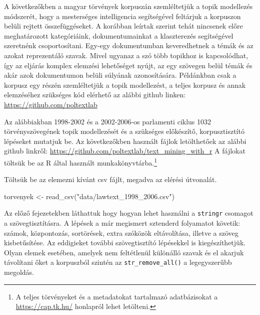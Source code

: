 \documentclass[
]{book}
\newenvironment{Shaded}{\begin{snugshade}}{\end{snugshade}}
\newcommand{\FunctionTok}[1]{\textcolor[rgb]{0.00,0.00,0.00}{#1}}
\newcommand{\NormalTok}[1]{#1}
\newcommand{\OtherTok}[1]{\textcolor[rgb]{0.56,0.35,0.01}{#1}}
\newcommand{\StringTok}[1]{\textcolor[rgb]{0.31,0.60,0.02}{#1}}
\begin{document}
A következőkben a magyar törvények korpuszán szemléltetjük a topik
modellezés módszerét, hogy a mesterséges intelligencia segítségével
feltárjuk a korpuszon belüli rejtett összefüggéseket. A korábban leírtak
szerint tehát nincsenek előre meghatározott kategóriáink,
dokumentumainkat a klaszterezés segítségével szeretnénk csoportosítani.
Egy-egy dokumentumban keveredhetnek a témák és az azokat reprezentáló
szavak. Mivel ugyanaz a szó több topikhoz is kapcsolódhat, így az
eljárás komplex elemzési lehetőséget nyújt, az egy szövegen belül témák
és akár azok dokumentumon belüli súlyának azonosítására. Példánkban csak
a korpusz egy részén szemléltetjük a topik modellezést, a teljes korpusz
és annak elemzéséhez szükséges kód elérhető az alábbi github linken:
\url{https://github.com/poltextlab}

Az alábbiakban 1998-2002 és a 2002-2006-os parlamenti ciklus 1032
törvényszövegének topik modellezését és a szükséges előkészítő,
korpusztisztító lépéseket mutatjuk be. Az következőkben használt fájlok
letölthetőek az alábbi github linkről:
\url{https://github.com/poltextlab/text_mining_with_r} A fájlokat
töltsük be az R által használt munkakönyvtárba.\footnote{A teljes
  törvényeket és a metadatokat tartalmazó adatbázisokat a
  \url{https://cap.tk.hu/} honlapról lehet letölteni.}

Töltsük be az elemezni kívánt csv fájlt, megadva az elérési útvonalát.

\begin{Shaded}
\begin{Highlighting}[]
\NormalTok{torvenyek }\OtherTok{\textless{}{-}} \FunctionTok{read\_csv}\NormalTok{(}\StringTok{"data/lawtext\_1998\_2006.csv"}\NormalTok{)}
\end{Highlighting}
\end{Shaded}

Az előző fejezetekben láthattuk hogy hogyan lehet használni a
\texttt{stringr} csomagot a szövegtisztításra. A lépések a már megismert
sztenderd folyamatot követik: számok, központozás, sortörések, extra
szóközök eltávolítása, illetve a szöveg kisbetűsítése. Az eddigieket
további szövegtisztító lépésekkel is kiegészíthetjük. Olyan elemek
esetében, amelyek nem feltétlenül különálló szavak és el akarjuk
távolítani őket a korpuszból szintén az \texttt{str\_remove\_all()} a
legegyszerűbb megoldás.
\end{document}

